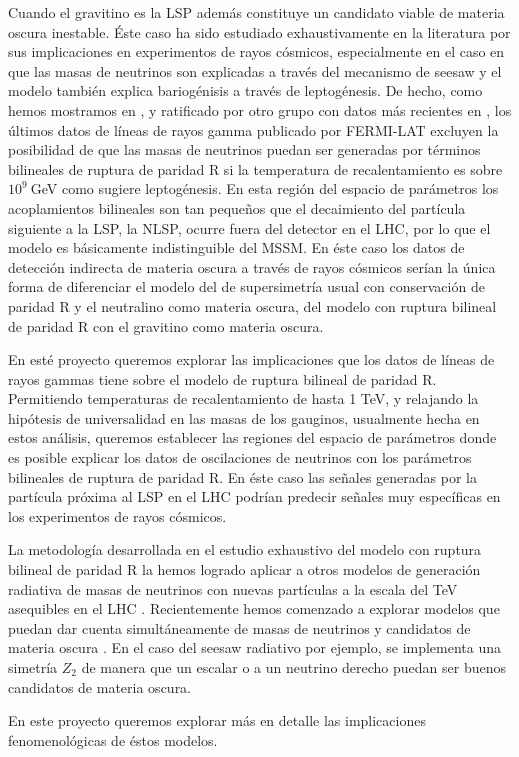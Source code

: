 Cuando el gravitino es la LSP además constituye un candidato viable de
materia oscura inestable. Éste caso ha sido estudiado exhaustivamente
en la literatura por sus implicaciones en experimentos de rayos
cósmicos, especialmente en el caso en que las masas de neutrinos son
explicadas a través del mecanismo de seesaw y el modelo también
explica bariogénisis a través de leptogénesis. De hecho, como hemos
mostramos en \cite{Choi:2010jt}, y ratificado por otro grupo con datos
más recientes en \cite{Garny:2010eg}, los últimos datos de líneas de
rayos gamma publicado por FERMI-LAT excluyen la posibilidad de que las
masas de neutrinos puedan ser generadas por términos bilineales de
ruptura de paridad R si la temperatura de recalentamiento es sobre
$10^9\ $GeV como sugiere leptogénesis. En esta región del espacio de
parámetros los acoplamientos bilineales son tan pequeños que el
decaimiento del partícula siguiente a la LSP, la NLSP, ocurre fuera
del detector en el LHC, por lo que el modelo es básicamente
indistinguible del MSSM. En éste caso los datos de detección indirecta
de materia oscura a través de rayos cósmicos serían la única forma de
diferenciar el modelo del de supersimetría usual con conservación de
paridad R y el neutralino como materia oscura, del modelo con ruptura
bilineal de paridad R con el gravitino como materia oscura.  
\begin{proyecto}
  En esté proyecto queremos explorar las implicaciones que los datos
  de líneas de rayos gammas tiene sobre el modelo de ruptura bilineal
  de paridad R. Permitiendo temperaturas de recalentamiento de hasta 1
  TeV, y relajando la hipótesis de universalidad en las masas de los
  gauginos, usualmente hecha en estos análisis, queremos establecer
  las regiones del espacio de parámetros donde es posible explicar los
  datos de oscilaciones de neutrinos con los parámetros bilineales de
  ruptura de paridad R. En éste caso las señales generadas por la
  partícula próxima al LSP en el LHC podrían predecir señales muy
  específicas en los experimentos de rayos cósmicos.
\end{proyecto}


La metodología desarrollada en el estudio exhaustivo del modelo con
ruptura bilineal de paridad R la hemos logrado aplicar a otros modelos
de generación radiativa de masas de neutrinos con nuevas partículas a
la escala del TeV asequibles en el LHC
\cite{Sierra:2008wj,AristizabalSierra:2006ri}. Recientemente hemos
comenzado a explorar modelos que puedan dar cuenta simultáneamente de
masas de neutrinos y candidatos de materia oscura
\cite{Hirsch:2005ag,Choi:2010jt,Sierra:2008wj}. En el caso del seesaw
radiativo por ejemplo, se implementa una simetría $Z_2$ de manera que
un escalar o a un neutrino derecho puedan ser buenos candidatos de
materia oscura. 
\begin{proyecto}
  En este proyecto queremos explorar más en detalle las implicaciones
  fenomenológicas de éstos modelos.
\end{proyecto}

